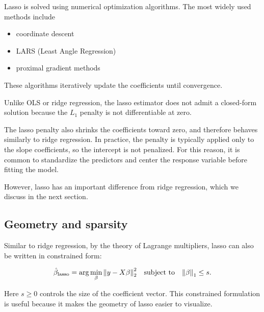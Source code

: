 \documentclass[
  letterpaper,
  DIV=11,
  numbers=noendperiod]{scrreprt}
\providecommand{\tightlist}{%
  \setlength{\itemsep}{0pt}\setlength{\parskip}{0pt}}
\newcommand{\lasso}{\mathrm{lasso}}
\theoremstyle{definition}
\theoremstyle{definition}
\theoremstyle{plain}
\theoremstyle{plain}
\theoremstyle{remark}
\begin{document}
\begin{tcolorbox}[enhanced jigsaw, arc=.35mm, bottomrule=.15mm, bottomtitle=1mm, breakable, colback=white, colbacktitle=quarto-callout-note-color!10!white, colframe=quarto-callout-note-color-frame, coltitle=black, left=2mm, leftrule=.75mm, opacityback=0, opacitybacktitle=0.6, rightrule=.15mm, title=\textcolor{quarto-callout-note-color}{\faInfo}\hspace{0.5em}{Solving lasso}, titlerule=0mm, toprule=.15mm, toptitle=1mm]

Lasso is solved using numerical optimization algorithms. The most widely
used methods include

\begin{itemize}
\tightlist
\item
  coordinate descent
\item
  LARS (Least Angle Regression)
\item
  proximal gradient methods
\end{itemize}

These algorithms iteratively update the coefficients until convergence.

Unlike OLS or ridge regression, the lasso estimator does not admit a
closed-form solution because the \(L_1\) penalty is not differentiable
at zero.

\end{tcolorbox}

The lasso penalty also shrinks the coefficients toward zero, and
therefore behaves similarly to ridge regression. In practice, the
penalty is typically applied only to the slope coefficients, so the
intercept is not penalized. For this reason, it is common to standardize
the predictors and center the response variable before fitting the
model.

However, lasso has an important difference from ridge regression, which
we discuss in the next section.

\subsection{Geometry and sparsity}\label{geometry-and-sparsity}

Similar to ridge regression, by the theory of Lagrange multipliers,
lasso can also be written in constrained form:

\[
\hat{\beta}_{\lasso}
=
\arg\min_{\beta}
\norm{y-X\beta}_2^2
\quad
\text{subject to}
\quad
\norm{\beta}_1 \le s.
\]

Here \(s \ge 0\) controls the size of the coefficient vector. This
constrained formulation is useful because it makes the geometry of lasso
easier to visualize.
\end{document}
